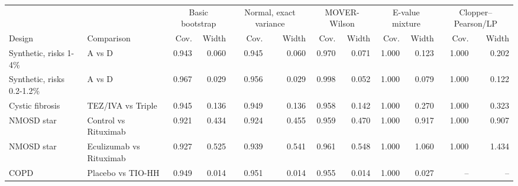 \begin{tabular}{llrrrrrrrrrr}
\toprule
 & & \multicolumn{2}{c}{Basic bootstrap} & \multicolumn{2}{c}{Normal, exact variance} & \multicolumn{2}{c}{MOVER-Wilson} & \multicolumn{2}{c}{E-value mixture} & \multicolumn{2}{c}{Clopper--Pearson/LP} \\
\cmidrule(lr){3-4}\cmidrule(lr){5-6}\cmidrule(lr){7-8}\cmidrule(lr){9-10}\cmidrule(lr){11-12}
Design & Comparison & Cov. & Width & Cov. & Width & Cov. & Width & Cov. & Width & Cov. & Width \\
\midrule
Synthetic, risks 1-4\% & A vs D & 0.943 & 0.060 & 0.945 & 0.060 & 0.970 & 0.071 & 1.000 & 0.123 & 1.000 & 0.202 \\
Synthetic, risks 0.2-1.2\% & A vs D & 0.967 & 0.029 & 0.956 & 0.029 & 0.998 & 0.052 & 1.000 & 0.079 & 1.000 & 0.122 \\
Cystic fibrosis & TEZ/IVA vs Triple & 0.945 & 0.136 & 0.949 & 0.136 & 0.958 & 0.142 & 1.000 & 0.270 & 1.000 & 0.323 \\
NMOSD star & Control vs Rituximab & 0.921 & 0.434 & 0.924 & 0.455 & 0.959 & 0.470 & 1.000 & 0.917 & 1.000 & 0.907 \\
NMOSD star & Eculizumab vs Rituximab & 0.927 & 0.525 & 0.939 & 0.541 & 0.961 & 0.548 & 1.000 & 1.060 & 1.000 & 1.434 \\
COPD & Placebo vs TIO-HH & 0.949 & 0.014 & 0.951 & 0.014 & 0.955 & 0.014 & 1.000 & 0.027 & -- & -- \\
\bottomrule
\end{tabular}
